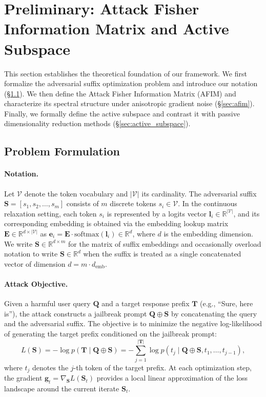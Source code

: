 \documentclass[preprint,12pt]{elsarticle}
\begin{document}
\section{Preliminary: Attack Fisher Information Matrix and Active Subspace}
\label{sec:preliminary}

This section establishes the theoretical foundation of our framework. We first formalize the adversarial suffix optimization problem and introduce our notation (\S\ref{sec:problem_formulation}). We then define the Attack Fisher Information Matrix (AFIM) and characterize its spectral structure under anisotropic gradient noise (\S\ref{sec:afim}). Finally, we formally define the active subspace and contrast it with passive dimensionality reduction methods (\S\ref{sec:active_subspace}).

\subsection{Problem Formulation}
\label{sec:problem_formulation}

\paragraph{Notation.} Let $\mathcal{V}$ denote the token vocabulary and $|\mathcal{V}|$ its cardinality. The adversarial suffix $\mathbf{S} = [s_1, s_2, \ldots, s_m]$ consists of $m$ discrete tokens $s_i \in \mathcal{V}$. In the continuous relaxation setting, each token $s_i$ is represented by a logits vector $\mathbf{l}_i \in \mathbb{R}^{|\mathcal{V}|}$, and its corresponding embedding is obtained via the embedding lookup matrix $\mathbf{E} \in \mathbb{R}^{d \times |\mathcal{V}|}$ as $\mathbf{e}_i = \mathbf{E} \cdot \text{softmax}(\mathbf{l}_i) \in \mathbb{R}^d$, where $d$ is the embedding dimension. We write $\mathbf{S} \in \mathbb{R}^{d \times m}$ for the matrix of suffix embeddings and occasionally overload notation to write $\mathbf{S} \in \mathbb{R}^d$ when the suffix is treated as a single concatenated vector of dimension $d = m \cdot d_{\text{emb}}$.

\paragraph{Attack Objective.} Given a harmful user query $\mathbf{Q}$ and a target response prefix $\mathbf{T}$ (e.g., ``Sure, here is''), the attack constructs a jailbreak prompt $\mathbf{Q} \oplus \mathbf{S}$ by concatenating the query and the adversarial suffix. The objective is to minimize the negative log-likelihood of generating the target prefix conditioned on the jailbreak prompt:
\begin{equation}
\label{eq:loss}
L(\mathbf{S}) = -\log p(\mathbf{T} \mid \mathbf{Q} \oplus \mathbf{S}) = -\sum_{j=1}^{|\mathbf{T}|} \log p(t_j \mid \mathbf{Q} \oplus \mathbf{S}, t_1, \ldots, t_{j-1}),
\end{equation}
where $t_j$ denotes the $j$-th token of the target prefix. At each optimization step, the gradient $\mathbf{g}_t = \nabla_{\mathbf{S}} L(\mathbf{S}_t)$ provides a local linear approximation of the loss landscape around the current iterate $\mathbf{S}_t$.
\end{document}
